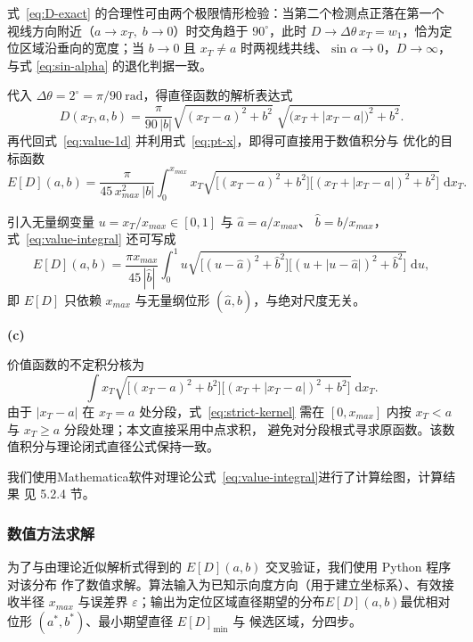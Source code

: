 式~\eqref{eq:D-exact} 的合理性可由两个极限情形检验：当第二个检测点正落在第一个
视线方向附近（$a\to x_T,\;b\to0$）时交角趋于 $90^\circ$，此时
$D\to\Delta\theta\,x_T=w_1$，恰为定位区域沿垂向的宽度；当 $b\to0$ 且
$x_T\neq a$ 时两视线共线、$\sin\alpha\to0$，$D\to\infty$，与式
\eqref{eq:sin-alpha} 的退化判据一致。

代入 $\Delta\theta=2^\circ=\pi/90\ \mathrm{rad}$，得直径函数的解析表达式
\begin{equation}
    D(x_T,a,b)=\frac{\pi}{90\,|b|}
    \sqrt{(x_T-a)^2+b^2}\;\sqrt{\bigl(x_T+\lvert x_T-a\rvert\bigr)^2+b^2}.
    \label{eq:D-final}
\end{equation}
再代回式~\eqref{eq:value-1d} 并利用式~\eqref{eq:pt-x}，即得可直接用于数值积分与
优化的目标函数
\begin{equation}
    E[D](a,b)=\frac{\pi}{45\,x_{max}^2\,|b|}
    \int_0^{x_{max}}x_T\sqrt{\bigl[(x_T-a)^2+b^2\bigr]
    \bigl[(x_T+\lvert x_T-a\rvert)^2+b^2\bigr]}\;\mathrm{d}x_T .
    \label{eq:value-integral}
\end{equation}

引入无量纲变量 $u=x_T/x_{max}\in[0,1]$ 与 $\hat a=a/x_{max}$、
$\hat b=b/x_{max}$，式~\eqref{eq:value-integral} 还可写成
\begin{equation}
    E[D](a,b)=\frac{\pi x_{max}}{45\,|\hat b|}
    \int_0^1u\sqrt{\bigl[(u-\hat a)^2+\hat b^2\bigr]
    \bigl[(u+\lvert u-\hat a\rvert)^2+\hat b^2\bigr]}\;\mathrm{d}u,
    \label{eq:value-scaled}
\end{equation}
即 $E[D]$ 只依赖 $x_{max}$ 与无量纲位形 $(\hat a,\hat b)$，与绝对尺度无关。

\noindent\textbf{(c)}\hspace{0.2em}{\heiti 价值函数的数值求积}\songti

价值函数的不定积分核为
\begin{equation}
    \int x_T\sqrt{\bigl[(x_T-a)^2+b^2\bigr]\bigl[(x_T+\lvert x_T-a\rvert)^2+b^2\bigr]}\;\mathrm{d}x_T .
    \label{eq:strict-kernel}
\end{equation}
由于 $\lvert x_T-a\rvert$ 在 $x_T=a$ 处分段，式~\eqref{eq:strict-kernel}
需在 $[0,x_{max}]$ 内按 $x_T<a$ 与 $x_T\ge a$ 分段处理；本文直接采用中点求积，
避免对分段根式寻求原函数。该数值积分与理论闭式直径公式保持一致。

我们使用Mathematica软件对理论公式~\eqref{eq:value-integral}进行了计算绘图，计算结果
见 5.2.4 节。

\subsubsection{数值方法求解}
为了与由理论近似解析式得到的 $E[D](a,b)$ 交叉验证，我们使用 Python 程序对该分布
作了数值求解。算法输入为已知示向度方向（用于建立坐标系）、有效接收半径
$x_{max}$ 与误差界
$\varepsilon$；输出为定位区域直径期望的分布$E[D](a,b)$最优相对位形 $(a^*,b^*)$、最小期望直径 $E[D]_{\min}$ 与
候选区域，分四步。

